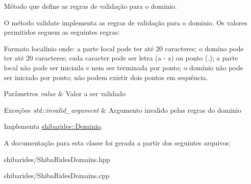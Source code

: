 Método que define as regras de validação para o dominio. 

O método validate implementa as regras de validação para o dominio. Os valores permitidos seguem as seguintes regras\+:

Formato localínio onde\+: a parte local pode ter até 20 caracteres; o domíno pode ter até 20 caracteres; cada caracter pode ser letra (a -\/ z) ou ponto (.); a parte local não pode ser iniciada e nem ser terminada por ponto; o domínio não pode ser iniciado por ponto; não podem existir dois pontos em sequência.


\begin{DoxyParams}{Parâmetros}
{\em value} & Valor a ser validado \\
\hline
\end{DoxyParams}

\begin{DoxyExceptions}{Exceções}
{\em std\+::invalid\+\_\+argument} & Argumento invalido pelas regras do dominio \\
\hline
\end{DoxyExceptions}


Implementa \hyperlink{classshibarides_1_1Dominio_acc9445531455c072bbf708709aebbe55}{shibarides\+::\+Dominio}.



A documentação para esta classe foi gerada a partir dos seguintes arquivos\+:\begin{DoxyCompactItemize}
\item 
shibarides/Shiba\+Rides\+Domains.\+hpp\item 
shibarides/Shiba\+Rides\+Domains.\+cpp\end{DoxyCompactItemize}
